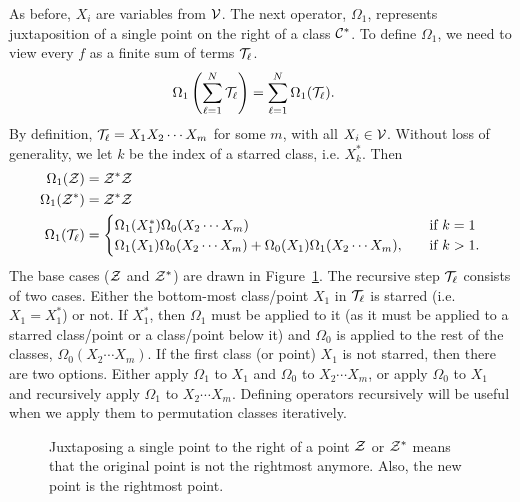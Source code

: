 \documentclass[12pt, a4paper, twoside]{report}
\begin{document}
As before, $X_i$ are variables from $\mathcal{V}$. The next operator, $\Omega_1$, represents juxtaposition of a single point on the right of a class $\mathcal{C}^*$. To define $\Omega_1$, we need to view every $f$ as a finite sum of terms $\mathcal{T}_\ell$. 
\begin{align*}
\Omega_1\left(\sum_{\ell=1}^N \mathcal{T}_\ell\right) &= \sum_{\ell=1}^N \Omega_1(\mathcal{T}_\ell).
\end{align*}
By definition, $\mathcal{T}_\ell = X_1X_2\cdots X_m$ for some $m$, with all $X_i \in \mathcal{V}$. Without loss of generality, we let $k$ be the index of a starred class, i.e. $X_k^*$. Then
\begin{align}
\begin{aligned}
    \Omega_1(\mathcal{Z}) &= \mathcal{Z}^*\mathcal{Z}\\
  \Omega_1(\mathcal{Z}^*) &= \mathcal{Z}^*\mathcal{Z}\\
  \Omega_1(\mathcal{T}_\ell) &=
                      \begin{cases}
                        \Omega_1(X_1^*)\Omega_0(X_2\cdots X_m) \quad &\text{if $k = 1$}\\
                        \Omega_1(X_1)\Omega_0(X_2\cdots X_m) + \Omega_0(X_1)\Omega_1(X_2\cdots X_m),\quad &\text{if $k>1$.}
                      \end{cases}
\end{aligned}
\label{eq:omega1Cstar}
\end{align}
The base cases ($\mathcal{Z}$ and $\mathcal{Z}^*$) are drawn in Figure~\ref{fig:omega_1}. The recursive step $\mathcal{T}_\ell$ consists of two cases. Either the bottom-most class/point $X_1$ in $\mathcal{T}_\ell$ is starred (i.e. $X_1 = X_1^*$) or not. If $X_1^*$, then $\Omega_1$ must be applied to it (as it must be applied to a starred class/point or a class/point below it) and $\Omega_0$ is applied to the rest of the classes, $\Omega_0(X_2\cdots X_m)$. If the first class (or point) $X_1$ is not starred, then there are two options. Either apply $\Omega_1$ to $X_1$ and $\Omega_0$ to $X_2\cdots X_m$, or apply $\Omega_0$ to $X_1$ and recursively apply $\Omega_1$ to $X_2\cdots X_m$. Defining operators recursively will be useful when we apply them to permutation classes iteratively.
\begin{figure}[ht]
 \centering
    \caption{Juxtaposing a single point to the right of a point $\mathcal{Z}$ or $\mathcal{Z}^*$ means that the original point is not the rightmost anymore. Also, the new point is the rightmost point.}
    \label{fig:omega_1}
\end{figure}
\end{document}
